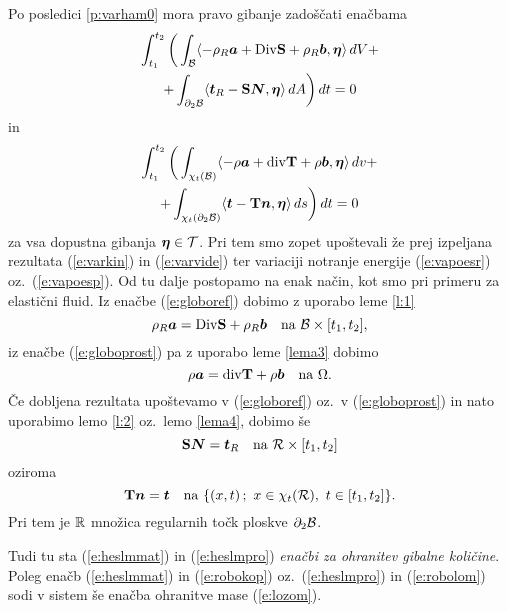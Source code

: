 Po posledici \ref{p:varham0} mora pravo gibanje zadoščati enačbama
\begin{multline} \label{e:globoref}
	\int_{t_1}^{t_2}\bigg( \int_{\mathcal B}\langle -\rho_R\boldsymbol a+
	\mathrm {Div}\mathbf S+\rho_R\boldsymbol b,\boldsymbol \eta\rangle \,dV+ \\
	+\int_{\partial_2 \mathcal B}\langle\boldsymbol t_R-\mathbf S\boldsymbol N,\boldsymbol \eta\rangle\,dA\bigg)\,dt=0
\end{multline}
in
\begin{multline} \label{e:globoprost}
	\int_{t_1}^{t_2}\bigg( \int_{\chi_t(\mathcal B)}\langle -\rho\boldsymbol a+
	\mathrm{div}\mathbf T+\rho\boldsymbol b,\boldsymbol \eta\rangle\,dv+ \\
	+\int_{\chi_t(\partial_2 \mathcal B)}\langle\boldsymbol t-\mathbf T\boldsymbol n,\boldsymbol \eta\rangle\,ds\bigg)\,dt=0
\end{multline}
za vsa dopustna gibanja $\boldsymbol \eta\in\mathcal{T}$. Pri tem smo zopet upoštevali
že prej izpeljana rezultata (\ref{e:varkin}) in (\ref{e:varvide}) ter
variaciji notranje energije (\ref{e:vapoesr}) oz.~(\ref{e:vapoesp}).
Od tu dalje postopamo na enak način, kot smo pri primeru za elastični fluid.
Iz enačbe (\ref{e:globoref}) dobimo z uporabo leme \ref{l:1}
\begin{equation} \label{e:heslmmat}
	\rho_R\vek{a}=\Div\ten{S}+\rho_R\vek{b}\quad\textrm{na}\ \B\times[t_1,t_2],
\end{equation}
iz enačbe (\ref{e:globoprost}) pa z uporabo leme \ref{lema3} dobimo
\begin{equation} \label{e:heslmpro}
	\rho\vek{a}=\div\ten{T}+\rho\vek{b}\quad\textrm{na}\ \Omega.
\end{equation}
Če dobljena rezultata upoštevamo v (\ref{e:globoref}) oz.~v (\ref{e:globoprost}) in
nato uporabimo lemo \ref{l:2} oz.~lemo \ref{lema4}, dobimo še
\begin{equation} \label{e:robokop}
	\ten{S}\vek{N}=\vek{t}_R\quad\textrm{na}\ \mathcal{R}\times[t_1,t_2]
\end{equation}
oziroma
\begin{equation} \label{e:robolom}
	\ten{T}\vek{n}=\vek{t}\quad\textrm{na}\ \{(x,t)\,;\ x\in\chi_t(\mathcal{R}),\ t\in[t_1,t_2] \}.
\end{equation}
Pri tem je $\mathbb R$ množica regularnih točk ploskve $\partial_2\mathcal B$.

Tudi tu sta (\ref{e:heslmmat}) in (\ref{e:heslmpro}) \emph{enačbi za ohranitev gibalne količine}.
Poleg enačb (\ref{e:heslmmat}) in (\ref{e:robokop}) oz.~(\ref{e:heslmpro}) in (\ref{e:robolom})
sodi v sistem še enačba ohranitve mase (\ref{e:lozom}).

